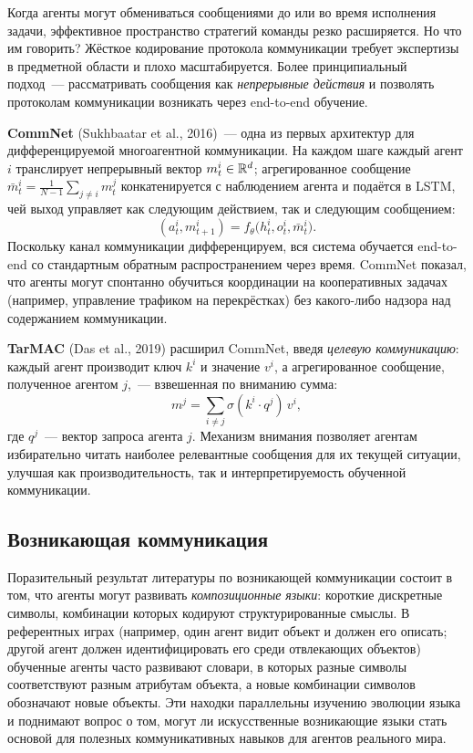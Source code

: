 Когда агенты могут обмениваться сообщениями до или во время исполнения задачи,
эффективное пространство стратегий команды резко расширяется. Но
что им говорить? Жёсткое кодирование протокола коммуникации требует
экспертизы в предметной области и плохо масштабируется. Более принципиальный подход~---
рассматривать сообщения как \emph{непрерывные действия} и позволять протоколам коммуникации
возникать через end-to-end обучение.

\textbf{CommNet} (Sukhbaatar et al., 2016)~---
одна из первых архитектур для дифференцируемой многоагентной
коммуникации. На каждом шаге каждый агент $i$ транслирует
непрерывный вектор $m^i_t \in \mathbb{R}^d$; агрегированное сообщение
$\bar{m}^i_t = \frac{1}{N-1}\sum_{j \neq i} m^j_t$ конкатенируется
с наблюдением агента и подаётся в LSTM, чей
выход управляет как следующим действием, так и следующим сообщением:
\[
  (a^i_t, m^i_{t+1}) = f_\theta\!\bigl(h^i_t, o^i_t, \bar{m}^i_t\bigr).
\]
Поскольку канал коммуникации дифференцируем, вся
система обучается end-to-end со стандартным обратным распространением через
время. CommNet показал, что агенты могут спонтанно обучиться
координации на кооперативных задачах (например, управление трафиком на перекрёстках)
без какого-либо надзора над содержанием коммуникации.

\textbf{TarMAC} (Das et al., 2019) расширил
CommNet, введя \emph{целевую коммуникацию}: каждый агент
производит ключ $k^i$ и значение $v^i$, а агрегированное сообщение,
полученное агентом $j$,~--- взвешенная по вниманию сумма:
\[
  m^j = \sum_{i \neq j} \sigma(k^i \cdot q^j)\, v^i,
\]
где $q^j$~--- вектор запроса агента $j$. Механизм внимания
позволяет агентам избирательно читать наиболее релевантные сообщения для их
текущей ситуации, улучшая как производительность, так и
интерпретируемость обученной коммуникации.

\subsection{Возникающая коммуникация}

Поразительный результат литературы по возникающей коммуникации состоит в том, что
агенты могут развивать \emph{композиционные языки}: короткие дискретные символы, комбинации которых
кодируют структурированные смыслы. В референтных играх
(например, один агент видит объект и должен его описать; другой агент
должен идентифицировать его среди отвлекающих объектов) обученные агенты часто развивают
словари, в которых разные символы соответствуют разным атрибутам объекта,
а новые комбинации символов обозначают новые объекты.
Эти находки параллельны изучению эволюции языка и поднимают
вопрос о том, могут ли искусственные возникающие языки стать основой
для полезных коммуникативных навыков для агентов реального мира.

